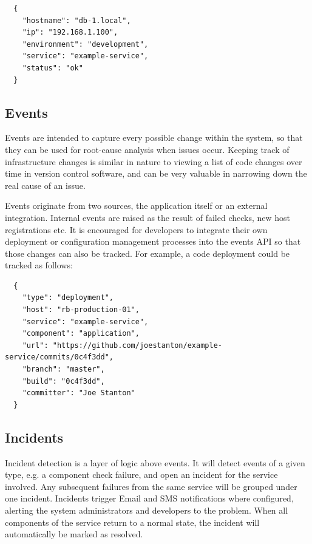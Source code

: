 \documentclass{cshonours}
\begin{document}
\begin{listing}[h]
\begin{verbatim}
  {
    "hostname": "db-1.local",
    "ip": "192.168.1.100",
    "environment": "development",
    "service": "example-service",
    "status": "ok"
  }
\end{verbatim}
\end{listing}

\subsection{Events}
Events are intended to capture every possible change within the system, so that they can be used for root-cause analysis when issues occur. Keeping track of infrastructure changes is similar in nature to viewing a list of code changes over time in version control software, and can be very valuable in narrowing down the real cause of an issue.

Events originate from two sources, the application itself or an external integration. Internal events are raised as the result of failed checks, new host registrations etc. It is encouraged for developers to integrate their own deployment or configuration management processes into the events API so that those changes can also be tracked. For example, a code deployment could be tracked as follows:

\begin{listing}[htbp]
\begin{verbatim}
  {
    "type": "deployment",
    "host": "rb-production-01",
    "service": "example-service",
    "component": "application",
    "url": "https://github.com/joestanton/example-service/commits/0c4f3dd",
    "branch": "master",
    "build": "0c4f3dd",
    "committer": "Joe Stanton"
  }
\end{verbatim}
\end{listing}

\pagebreak
\subsection{Incidents}

Incident detection is a layer of logic above events. It will detect events of a given type, e.g. a component check failure, and open an incident for the service involved. Any subsequent failures from the same service will be grouped under one incident. Incidents trigger Email and SMS notifications where configured, alerting the system administrators and developers to the problem. When all components of the service return to a normal state, the incident will automatically be marked as resolved.
\end{document}
